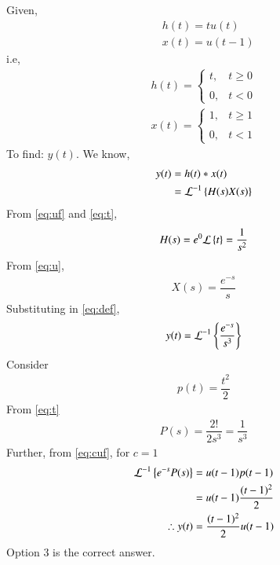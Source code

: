 \documentclass[journal,12pt,twocolumn]{IEEEtran}
\begin{document}
Given,
\begin{align}
    &h(t)=tu(t)\\
    &x(t)=u(t-1)
\end{align}
i.e,
\begin{align}
    \label{eq:1}
    h(t)=\begin{cases}
	t, & t \geq 0 \\~\\[-1em]
	0, & t <0
	\end{cases}\\
	\label{eq:2}
	x(t)=\begin{cases}
	1, & t \geq 1 \\~\\[-1em]
	0, & t <1
	\end{cases} 
\end{align}
To find: $y(t)$. We know, 
\begin{align}
y(t)&=h(t)*x(t)\\
&=\mathcal{L}^{-1}\left\{H(s)X(s)\right\}
\label{eq:def}
\end{align}
From \eqref{eq:uf} and \eqref{eq:t}, 
\begin{align}
H(s)=e^{0}\mathcal{L}\left\{t\right\}=\dfrac{1}{s^2}
\end{align}
From \eqref{eq:u}, 
\begin{align}
X(s)=\dfrac{e^{-s}}{s}
\end{align}
Substituting in \eqref{eq:def},
\begin{align}
y(t)=\mathcal{L}^{-1}\left\{\dfrac{e^{-s}}{s^3}\right\}
\end{align}
Consider 
\begin{align}
    p(t)=\dfrac{t^{2}}{2}
\end{align}
From \eqref{eq:t}
\begin{align}
    P(s)=\dfrac{2!}{2s^3}=\dfrac{1}{s^3}
\end{align}
Further, from \eqref{eq:cuf}, for $c=1$
\begin{align}
    \mathcal{L}^{-1}\left\{e^{-s}P(s)\right\}&=u(t-1)p(t-1)\\
    &=u(t-1)\dfrac{(t-1)^2}{2}\\
    \therefore y(t)&=\dfrac{(t-1)^2}{2}u(t-1)
\end{align}
Option 3 is the correct answer.
\end{document}
